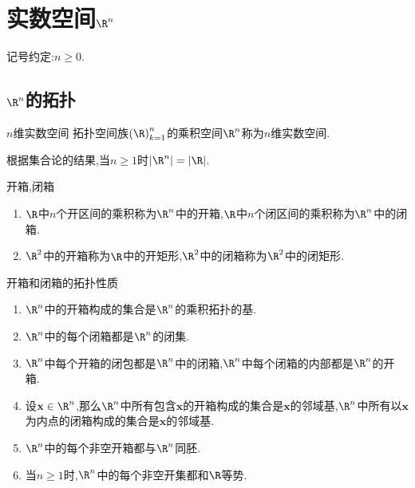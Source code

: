 \chapter{实数空间\texorpdfstring{$\R^{n}$}{Rn}}

记号约定:$n\geq 0$.

\section{\texorpdfstring{$\R^{n}$}{Rn}的拓扑}

\begin{definition}{$n$维实数空间}{}
	拓扑空间族$\left(\R\right)_{k=1}^{n}$的乘积空间$\R^{n}$称为$n$维实数空间.
\end{definition}

\begin{remark}{}{}
	根据集合论的结果,当$n\geq 1$时$\left|\R^{n}\right|=\left|\R\right|$.
\end{remark}

\begin{definition}{开箱,闭箱}{}
	\begin{enumerate}
		\item $\R$中$n$个开区间的乘积称为$\R^{n}$中的开箱,$\R$中$n$个闭区间的乘积称为$\R^{n}$中的闭箱.
		\item $\R^{2}$中的开箱称为$\R$中的开矩形,$\R^{2}$中的闭箱称为$\R^{2}$中的闭矩形.
	\end{enumerate}
\end{definition}

\begin{proposition}{开箱和闭箱的拓扑性质}{}
	\begin{enumerate}
		\item $\R^{n}$中的开箱构成的集合是$\R^{n}$的乘积拓扑的基.
		\item $\R^{n}$中的每个闭箱都是$\R^{n}$的闭集.
		\item $\R^{n}$中每个开箱的闭包都是$\R^{n}$中的闭箱,$\R^{n}$中每个闭箱的内部都是$\R^{n}$的开箱.
		\item 设$\mathbf{x}\in\R^{n}$,那么$\R^{n}$中所有包含$\mathbf{x}$的开箱构成的集合是$\mathbf{x}$的邻域基,$\R^{n}$中所有以$\mathbf{x}$为内点的闭箱构成的集合是$\mathbf{x}$的邻域基.
		\item $\R^{n}$中的每个非空开箱都与$\R^{n}$同胚.
		\item 当$n\geq 1$时,$\R^{n}$中的每个非空开集都和$\R$等势.
	\end{enumerate}
\end{proposition}

